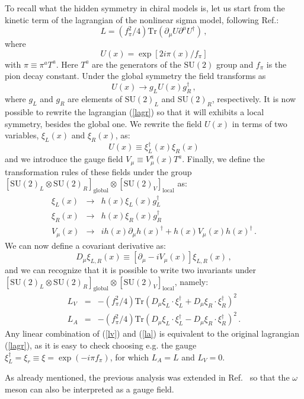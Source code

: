 \documentclass[]{revtex4}
\def\be{\begin{equation}}
\def\ee{\end{equation}}
\def\bq{\begin{eqnarray}}
\def\eq{\end{eqnarray}}
\begin{document}
To recall what the hidden symmetry in chiral models
is, let us start
from the kinetic term of the lagrangian of the nonlinear sigma model, 
following Ref.\cite{Bando:1984ej}:
\be
L=\left (f_\pi^2/4\right )
\mathrm{Tr}\left (\partial_\mu U\partial ^\mu U^\dagger \right)\, ,\label{lagr}
\ee
where 
\be
U(x)=\exp[2 i \pi(x)/f_\pi]
\ee
with $\pi\equiv \pi^a T^a$. Here $T^a$ are the generators of the
$\mathrm{SU(2)}$ group and $f_\pi$ is the pion decay constant.
Under the global symmetry the field transforms as 
\be
U(x)\rightarrow g_L U(x) g_R^\dagger \, ,
\ee
where $g_L$ and $g_R$ are elements of $\mathrm{SU(2)}_L$ and 
$\mathrm{SU(2)}_R$, respectively.
It is now possible to rewrite the lagrangian (\ref{lagr}) so that
it will exhibits a local symmetry, besides the global one. 
We rewrite the field $U(x)$ in terms of two variables, 
$\xi_L(x)$ and $\xi_R(x)$, as:
\be
U(x)\equiv\xi_L^\dagger(x)\xi_R(x)
\ee
and we introduce the gauge field $V_\mu\equiv V_\mu^a(x) T^a$. 
Finally, we define the transformation rules of these fields
under the group
$[\mathrm{SU(2)}_L\otimes\mathrm{SU(2)}_R]_\mathrm{global}
\otimes [\mathrm{SU(2)}_V]_\mathrm{local}$ as:
\bq
\xi_L(x)&\rightarrow& h(x)\xi_L(x) g_L^\dagger \nonumber \\
\xi_R(x)&\rightarrow& h(x)\xi_R(x) g_R^\dagger\\ 
V_\mu(x)&\rightarrow& ih(x)\partial_\mu h(x)^\dagger+h(x)V_\mu(x)h(x)^\dagger
\nonumber \, .
\eq
We can now define a covariant derivative as:
\be
D_\mu\xi_{L,R}(x)\equiv[\partial_\mu-iV_\mu(x)]\xi_{L,R}(x)\, ,
\ee
and we can recognize that it is possible to write two invariants
under $[\mathrm{SU(2)}_L\otimes\mathrm{SU(2)}_R]_\mathrm{global}
\otimes [\mathrm{SU(2)}_V]_\mathrm{local}$, namely:
\bq
L_V&=&-\left (f_\pi^2/4\right )\mathrm{Tr}\left (D_\mu\xi_L\cdot\xi_L^\dagger+
        D_\mu\xi_R\cdot\xi_R^\dagger\right )^2 \label{lv}\\
L_A&=&-\left (f_\pi^2/4\right )\mathrm{Tr}\left (D_\mu\xi_L\cdot\xi_L^\dagger-
        D_\mu\xi_R\cdot\xi_R^\dagger\right )^2\, .\label{la}
\eq
Any linear combination of (\ref{lv}) 
and (\ref{la}) is equivalent to the original lagrangian (\ref{lagr}),
as it is easy to check choosing e.g. the gauge
$\xi_L^\dagger=\xi_r\equiv\xi=\exp(-i \pi f_\pi)$, for which
$L_A=L$ and $L_V=0$.

As already mentioned, 
the previous analysis was extended in Ref.~\cite{Meissner:1986ka}
so that the $\omega$ meson can also be interpreted as a gauge
field.
\end{document}
